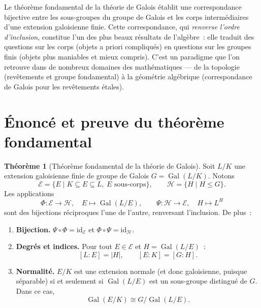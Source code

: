 \documentclass[12pt,a4paper,openany]{book}
\theoremstyle{definition}
\newtheorem{theoreme}{Théorème}[chapter]
\newcommand{\Gal}{\operatorname{Gal}}
\begin{document}
\bigskip
\noindent
Le théorème fondamental de la théorie de Galois établit une correspondance
bijective entre les sous-groupes du groupe de Galois et les corps
intermédiaires d'une extension galoisienne finie. Cette correspondance, qui
\emph{renverse l'ordre d'inclusion}, constitue l'un des plus beaux résultats
de l'algèbre~: elle traduit des questions sur les corps (objets a priori
compliqués) en questions sur les groupes finis (objets plus maniables et mieux
compris). C'est un paradigme que l'on retrouve dans de nombreux domaines des
mathématiques --- de la topologie (revêtements et groupe fondamental) à la
géométrie algébrique (correspondance de Galois pour les revêtements étales).

\section{Énoncé et preuve du théorème fondamental}\label{sec:enonce-preuve-FTGT}

\begin{theoreme}[Théorème fondamental de la théorie de Galois]\label{thm:fondamental-galois}
Soit $L/K$ une extension galoisienne finie de groupe de Galois
$G = \Gal(L/K)$. Notons
\[
  \mathcal{E} = \{E \mid K \subseteq E \subseteq L,\ E \text{ sous-corps}\},
  \qquad
  \mathcal{H} = \{H \mid H \leq G\}.
\]
Les applications
\[
  \Phi \colon \mathcal{E} \to \mathcal{H}, \quad E \mapsto \Gal(L/E),
  \qquad
  \Psi \colon \mathcal{H} \to \mathcal{E}, \quad H \mapsto L^H
\]
sont des bijections réciproques l'une de l'autre, renversant l'inclusion.
De plus~:
\begin{enumerate}[label=(\roman*)]
  \item \textbf{Bijection.} $\Psi \circ \Phi = \mathrm{id}_{\mathcal{E}}$
    et $\Phi \circ \Psi = \mathrm{id}_{\mathcal{H}}$.
  \item \textbf{Degrés et indices.} Pour tout $E \in \mathcal{E}$ et
    $H = \Gal(L/E)$~:
    \[
      [L:E] = |H|, \qquad [E:K] = [G:H].
    \]
  \item \textbf{Normalité.} $E/K$ est une extension normale (et donc
    galoisienne, puisque séparable) si et seulement si $\Gal(L/E)$ est
    un sous-groupe distingué de $G$. Dans ce cas,
    \[
      \Gal(E/K) \cong G / \Gal(L/E).
    \]
\end{enumerate}
\end{theoreme}
\end{document}
